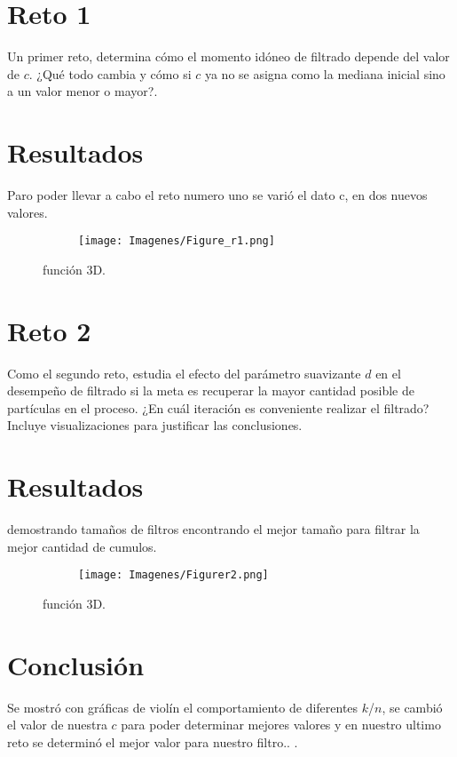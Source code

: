 \documentclass{article}
\begin{document}
\newpage
\section{Reto 1}
 Un primer reto, determina cómo el momento idóneo de filtrado depende del valor de $c$. ¿Qué todo cambia y cómo si $c$ ya no se asigna como la mediana inicial sino a un valor menor o mayor?.


\section{Resultados}
Paro poder llevar a cabo el reto numero uno se varió el dato c, en dos nuevos valores.
\begin{figure}[H]
\centering
\begin{subfigure}[b]{1.0\linewidth}
\texttt{[image: Imagenes/Figure\_r1.png]}
\end{subfigure}
\caption{función 3D.}
\label{fig:westminster}
\end{figure}

\newpage
\section{Reto 2}

Como el segundo reto, estudia el efecto del parámetro suavizante $d$ en el desempeño de filtrado si la meta es recuperar la mayor cantidad posible de partículas en el proceso. ¿En cuál iteración es conveniente realizar el filtrado? Incluye visualizaciones para justificar las conclusiones.
 
\section{Resultados}
demostrando tamaños de filtros encontrando el mejor tamaño para filtrar la mejor cantidad de cumulos.
\begin{figure}[H]
\centering
\begin{subfigure}[b]{1.0\linewidth}
\texttt{[image: Imagenes/Figurer2.png]}
\end{subfigure}
\caption{función 3D.}
\label{fig:westminster}
\end{figure}



\newpage
 \section{Conclusión}
Se mostró con gráficas de violín el comportamiento de diferentes $k$/$n$, se cambió el valor de nuestra $c$ para poder determinar mejores valores y en nuestro ultimo reto se determinó el mejor valor para nuestro filtro.. 
.

 
 

 
\end{document}
